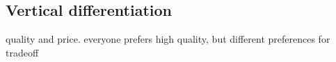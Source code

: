 
\subsection{Vertical differentiation}

quality and price. everyone prefers high quality, but different preferences for tradeoff

